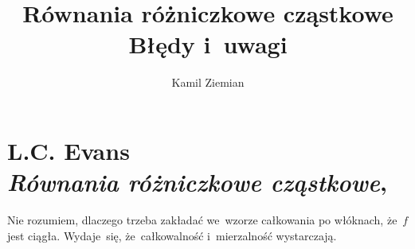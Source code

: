 \documentclass[a4paper,11pt]{article}
\title{Równania różniczkowe cząstkowe \\
  {\Large Błędy i~uwagi}}
\author{Kamil Ziemian}
\numberwithin{equation}{section}
\begin{document}





\maketitle %





\section{ %
  L.C. Evans \\
  \textit{Równania różniczkowe cząstkowe},
  \cite{EvansRowaniaRozniczoweCzastkowe2008}}

\vspace{0em}



\vspace{0em}


\noindent
{}

\VerSpaceFour





\noindent
{} Nie rozumiem, dlaczego trzeba zakładać we~wzorze całkowania po
włóknach, że~$f$ jest ciągła. Wydaje~się, że~całkowalność i~mierzalność
wystarczają.

\VerSpaceFour






\end{document}
